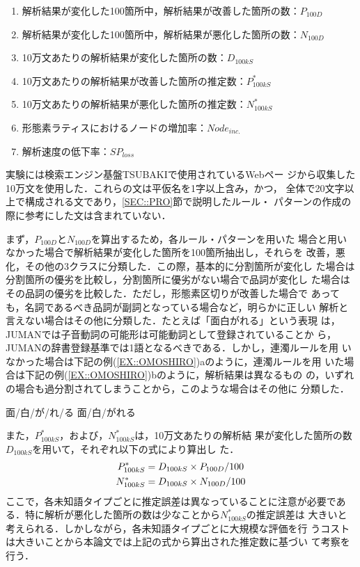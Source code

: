 \documentclass[japanese]{jnlp_1.4}
\begin{document}
  \begin{enumerate}
   \item 解析結果が変化した100箇所中，解析結果が改善した箇所の数：$P_{100D}$
   \item 解析結果が変化した100箇所中，解析結果が悪化した箇所の数：$N_{100D}$
   \item 10万文あたりの解析結果が変化した箇所の数：$D_{100kS}$
   \item 10万文あたりの解析結果が改善した箇所の推定数：$P^{*}_{100kS}$
   \item 10万文あたりの解析結果が悪化した箇所の推定数：$N^{*}_{100kS}$
   \item 形態素ラティスにおけるノードの増加率：$N\!ode_{inc.}$
   \item 解析速度の低下率：$SP_{loss}$
  \end{enumerate}

  実験には検索エンジン基盤TSUBAKI\cite{Shinzato2008}で使用されているWebペー
  ジから収集した10万文を使用した．これらの文は平仮名を1字以上含み，かつ，
  全体で20文字以上で構成される文であり，\ref{SEC::PRO}節で説明したルール・
  パターンの作成の際に参考にした文は含まれていない．

  まず，$P_{100D}$と$N_{100D}$を算出するため，各ルール・パターンを用いた
  場合と用いなかった場合で解析結果が変化した箇所を100箇所抽出し，それらを
  改善，悪化，その他の3クラスに分類した．この際，基本的に分割箇所が変化し
  た場合は分割箇所の優劣を比較し，分割箇所に優劣がない場合で品詞が変化し
  た場合はその品詞の優劣を比較した．ただし，形態素区切りが改善した場合で
  あっても，名詞であるべき品詞が副詞となっている場合など，明らかに正しい
  解析と言えない場合はその他に分類した．たとえば「面白がれる」という表現
  は，JUMANでは子音動詞の可能形は可能動詞として登録されていることか
  ら，JUMANの辞書登録基準では1語となるべきである．しかし，連濁ルールを用
  いなかった場合は下記の例(\ref{EX::OMOSHIRO})aのように，連濁ルールを用
  いた場合は下記の例(\ref{EX::OMOSHIRO})bのように，解析結果は異なるもの
  の，いずれの場合も過分割されてしまうことから，このような場合はその他に
  分類した．

\begin{exe}
\ex \label{EX::OMOSHIRO}
\begin{xlist}
  \ex 面/白/が/れ/る
  \ex 面/白/がれる
\end{xlist}
\end{exe}

  また，$P^{*}_{100kS}$，および，$N^{*}_{100kS}$は，10万文あたりの解析結
  果が変化した箇所の数$D_{100kS}$を用いて，それぞれ以下の式により算出し
  た．
  \begin{align*}
   P^{*}_{100kS} & = D_{100kS} \times P_{100D}/100\notag\\   
   N^{*}_{100kS} & = D_{100kS} \times N_{100D}/100\notag
  \end{align*}
  ここで，各未知語タイプごとに推定誤差は異なっていることに注意が必要であ
  る．特に解析が悪化した箇所の数は少なことから$N^{*}_{100kS}$の推定誤差は
  大きいと考えられる．しかしながら，各未知語タイプごとに大規模な評価を行
  うコストは大きいことから本論文では上記の式から算出された推定数に基づい
  て考察を行う．
\end{document}
